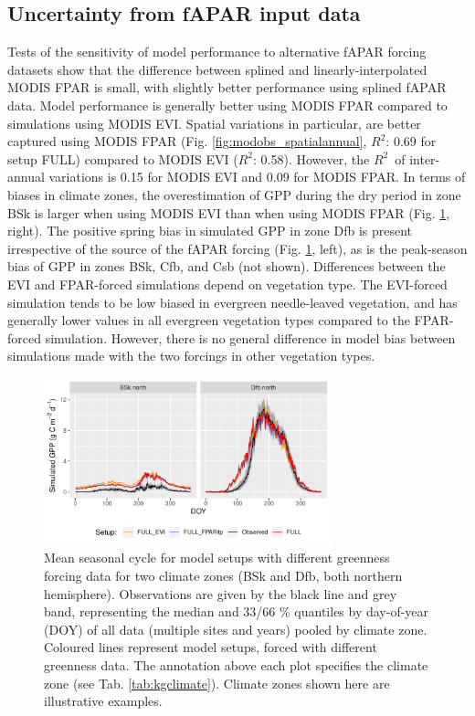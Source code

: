 \documentclass[gmd, manuscript]{copernicus}
\newcommand{\rsq}{$R^2$}
\begin{document}
\subsection{Uncertainty from fAPAR input data}
\label{sec:results_greenness}

Tests of the sensitivity of model performance to alternative fAPAR forcing datasets show that the difference between splined and linearly-interpolated MODIS FPAR is small, with slightly better performance using splined fAPAR data. Model performance is generally better using MODIS FPAR compared to simulations using MODIS EVI. Spatial variations in particular, are better captured using MODIS FPAR (Fig. \ref{fig:modobs_spatialannual}, \rsq : 0.69 for setup FULL) compared to MODIS EVI (\rsq : 0.58). However, the \rsq\ of inter-annual variations is 0.15 for MODIS EVI and 0.09 for MODIS FPAR. In terms of biases in climate zones, the overestimation of GPP during the dry period in zone BSk is larger when using MODIS EVI than when using MODIS FPAR (Fig. \ref{fig:season_greenness}, right). The positive spring bias in simulated GPP in zone Dfb is present irrespective of the source of the fAPAR forcing (Fig. \ref{fig:season_greenness}, left), as is the peak-season bias of GPP in zones BSk, Cfb, and Csb (not shown). Differences between the EVI and FPAR-forced simulations depend on vegetation type. The EVI-forced simulation tends to be low biased in evergreen needle-leaved vegetation, and has generally lower values in all evergreen vegetation types compared to the FPAR-forced simulation. However, there is no general difference in model bias between simulations made with the two forcings in other vegetation types. 

 \begin{figure}[t]
\includegraphics[width=8.3cm]{fig/meandoy_byzone_greenness.pdf}
    \caption{Mean seasonal cycle for model setups with different greenness forcing data for two climate zones (BSk and Dfb, both northern hemisphere). Observations are given by the black line and grey band, representing the median and 33/66 \% quantiles by day-of-year (DOY) of all data (multiple sites and years) pooled by climate zone. Coloured lines represent model setups, forced with different greenness data. The annotation above each plot specifies the climate zone (see Tab. \ref{tab:kgclimate}). Climate zones shown here are illustrative examples.}
    \label{fig:season_greenness}
\end{figure}
\end{document}
